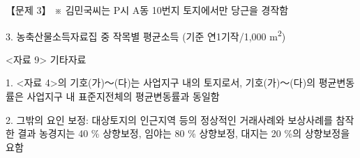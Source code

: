 \begin{longquestion}{【문제 3】}
※ 김민국씨는 P시 A동 10번지 토지에서만 당근을 경작함 \par
3. 농축산물소득자료집 중 작목별 평균소득	(기준 연1기작/1,000 m\textsuperscript{2}) \par
{\small\centering
{}\par}

<자료 9> 기타자료 \par
1. <자료 4>의 기호(가)～(다)는 사업지구 내의 토지로서, 기호(가)～(다)의 평균변동률은 사업지구 내 표준지전체의 평균변동률과 동일함 \par
2. 그밖의 요인 보정: 대상토지의 인근지역 등의 정상적인 거래사례와 보상사례를 참작한 결과 농경지는 40 \% 상향보정, 임야는 80 \% 상향보정, 대지는 20 \%의 상향보정을 요함 \par
\end{longquestion}

